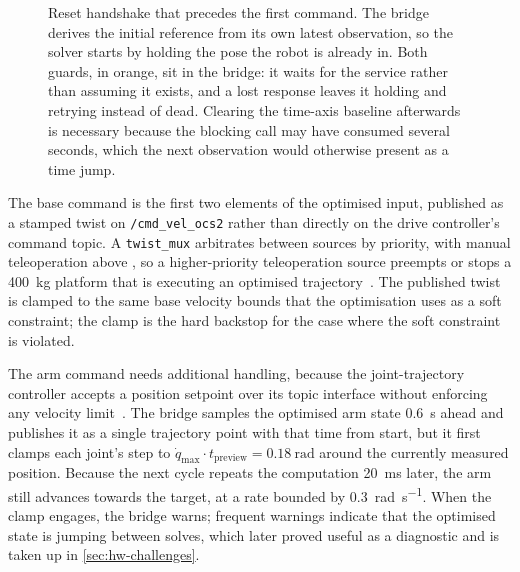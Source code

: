 \begin{figure}[htbp]
  \caption[Reset handshake between the MRT bridge and the \mpc{} node]{%
    Reset handshake that precedes the first command. The bridge derives
    the initial reference from its own latest observation, so the solver
    starts by holding the pose the robot is already in. Both guards, in
    orange, sit in the bridge: it waits for the service rather than
    assuming it exists, and a lost response leaves it holding and
    retrying instead of dead. Clearing the time-axis baseline
    afterwards is necessary because the blocking call may have consumed
    several seconds, which the next observation would otherwise present as
    a time jump.}
  \label{fig:reset-handshake}
\end{figure}

The base command is the first two elements of the optimised input,
published as a stamped twist on \texttt{/cmd\_vel\_ocs2} rather than
directly on the drive controller's command topic. A \texttt{twist\_mux}
arbitrates between sources by priority, with manual teleoperation above
\ocs{}, so a higher-priority teleoperation source preempts or stops a
\qty{400}{\kilo\gram} platform that is executing an optimised
trajectory~\cite{twistMux}. The published twist is clamped to the same
base velocity bounds that the optimisation uses as a soft constraint; the
clamp is the hard backstop for the case where the soft constraint is
violated.

The arm command needs additional handling, because the joint-trajectory
controller accepts a position setpoint over its topic interface without
enforcing any velocity limit~\cite{ros2control}. The bridge samples the
optimised arm state \qty{0.6}{\second} ahead and publishes it as a single
trajectory point with that time from start, but it first clamps each
joint's step to
$\dot{q}_\mathrm{max} \cdot t_\mathrm{preview} = \qty{0.18}{\radian}$
around the currently measured position. Because the next cycle repeats
the computation \qty{20}{\milli\second} later, the arm still advances
towards the target, at a rate bounded by
\qty{0.3}{\radian\per\second}. When the clamp engages, the bridge warns;
frequent warnings indicate that the optimised state is jumping between
solves, which later proved useful as a diagnostic and is taken up in
\cref{sec:hw-challenges}.


